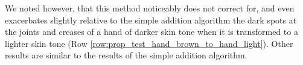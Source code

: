 We noted however, that this method noticeably does not correct for, and even exacerbates slightly relative to the simple addition algorithm the dark spots at the joints and creases of a hand of darker skin tone when it is transformed to a lighter skin tone (Row \ref{row:prop_test_hand_brown_to_hand_light}). Other results are similar to the results of the simple addition algorithm.
